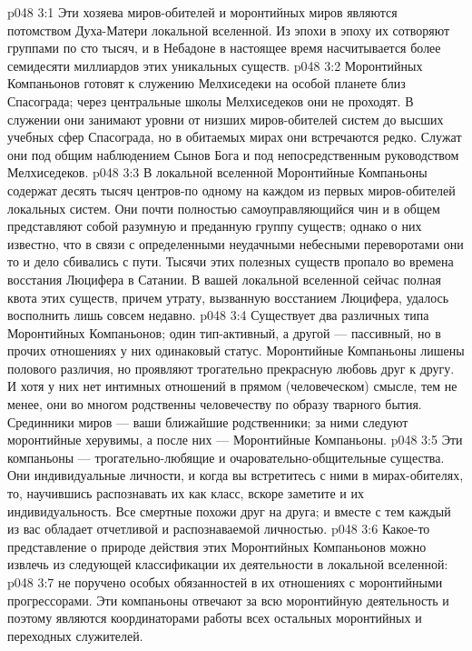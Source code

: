 \vs p048 3:1 Эти хозяева миров\hyp{}обителей и моронтийных миров являются потомством Духа\hyp{}Матери локальной вселенной. Из эпохи в эпоху их сотворяют группами по сто тысяч, и в Небадоне в настоящее время насчитывается более семидесяти миллиардов этих уникальных существ.
\vs p048 3:2 Моронтийных Компаньонов готовят к служению Мелхиседеки на особой планете близ Спасограда; через центральные школы Мелхиседеков они не проходят. В служении они занимают уровни от низших миров\hyp{}обителей систем до высших учебных сфер Спасограда, но в обитаемых мирах они встречаются редко. Служат они под общим наблюдением Сынов Бога и под непосредственным руководством Мелхиседеков.
\vs p048 3:3 В локальной вселенной Моронтийные Компаньоны содержат десять тысяч центров\hyp{}по одному на каждом из первых миров\hyp{}обителей локальных систем. Они почти полностью самоуправляющийся чин и в общем представляют собой разумную и преданную группу существ; однако о них известно, что в связи с определенными неудачными небесными переворотами они то и дело сбивались с пути. Тысячи этих полезных существ пропало во времена восстания Люцифера в Сатании. В вашей локальной вселенной сейчас полная квота этих существ, причем утрату, вызванную восстанием Люцифера, удалось восполнить лишь совсем недавно.
\vs p048 3:4 \pc Существует два различных типа Моронтийных Компаньонов; один тип\hyp{}активный, а другой --- пассивный, но в прочих отношениях у них одинаковый статус. Моронтийные Компаньоны лишены полового различия, но проявляют трогательно прекрасную любовь друг к другу. И хотя у них нет интимных отношений в прямом (человеческом) смысле, тем не менее, они во многом родственны человечеству по образу тварного бытия. Срединники миров --- ваши ближайшие родственники; за ними следуют моронтийные херувимы, а после них --- Моронтийные Компаньоны.
\vs p048 3:5 Эти компаньоны --- трогательно\hyp{}любящие и очаровательно\hyp{}общительные существа. Они индивидуальные личности, и когда вы встретитесь с ними в мирах\hyp{}обителях, то, научившись распознавать их как класс, вскоре заметите и их индивидуальность. Все смертные похожи друг на друга; и вместе с тем каждый из вас обладает отчетливой и распознаваемой личностью.
\vs p048 3:6 \pc Какое\hyp{}то представление о природе действия этих Моронтийных Компаньонов можно извлечь из следующей классификации их деятельности в локальной вселенной:
\vs p048 3:7 \bibnobreakspace {} не поручено особых обязанностей в их отношениях с моронтийными прогрессорами. Эти компаньоны отвечают за всю моронтийную деятельность и поэтому являются координаторами работы всех остальных моронтийных и переходных служителей.
